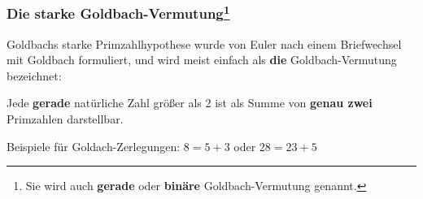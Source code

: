 \begin{refsegment}
\hypertarget{HT-StrongGoldbachConjecture}{}
\subsubsection[Die starke Goldbach-Vermutung]%
   {Die starke Goldbach-Vermutung\footnote{%
   Sie wird auch \textbf{gerade} oder \textbf{binäre} Goldbach-Vermutung
   genannt.
   } }%
%
\label{L-StrongGoldbachConjecture}%

 Goldbachs starke Primzahlhypothese wurde von Euler nach einem Briefwechsel mit Goldbach formuliert, und wird meist einfach als \textbf{die} Goldbach-Vermutung bezeichnet:

Jede \textbf{gerade} natürliche Zahl größer als 2 ist als Summe von \textbf{genau zwei} Primzahlen darstellbar.

Beispiele für Goldach-Zerlegungen: $8 = 5 + 3$ oder $28 = 23 + 5$


\end{refsegment}
